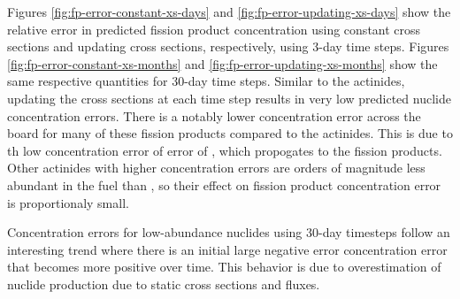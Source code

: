     Figures \ref{fig:fp-error-constant-xs-days} and
    \ref{fig:fp-error-updating-xs-days} show the relative error in predicted
    fission product concentration using constant cross sections and updating
    cross sections, respectively, using 3-day time steps. Figures
    \ref{fig:fp-error-constant-xs-months} and
    \ref{fig:fp-error-updating-xs-months} show the same respective quantities
    for 30-day time steps. Similar to the actinides, updating the cross sections
    at each time step results in very low predicted nuclide concentration
    errors.  There is a notably lower concentration error across the board for
    many of these fission products compared to the actinides. This is due to th
    low concentration error of error of , which propogates to the
    fission products. Other actinides with higher concentration errors are
    orders of magnitude less abundant in the fuel than , so their
    effect on fission product concentration error is proportionaly small.

    Concentration errors for low-abundance nuclides using 30-day timesteps follow
    an interesting trend where there is an initial large negative error
    concentration error that becomes more positive over time. This behavior is due
    to overestimation of nuclide production due to static cross sections and
    fluxes.


